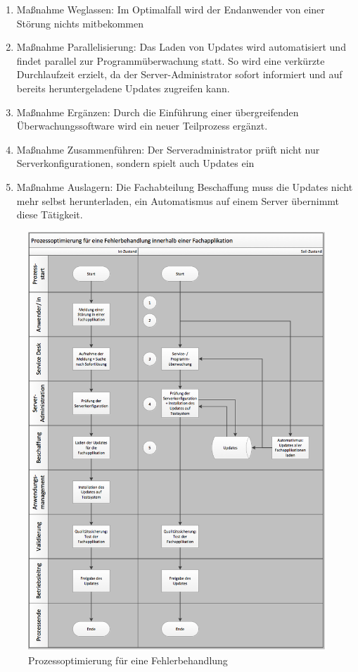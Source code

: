 \begin{enumerate}
	\item Maßnahme Weglassen: Im Optimalfall wird der Endanwender von einer Störung nichts mitbekommen
	\item Maßnahme Parallelisierung: Das Laden von Updates wird automatisiert und findet parallel zur Programmüberwachung statt. So wird eine verkürzte Durchlaufzeit erzielt, da der Server-Administrator sofort informiert und auf bereits heruntergeladene Updates zugreifen kann.
	\item Maßnahme Ergänzen: Durch die Einführung einer übergreifenden Überwachungssoftware wird ein neuer Teilprozess ergänzt.
	\item Maßnahme Zusammenführen: Der Serveradministrator prüft nicht nur Serverkonfigurationen, sondern spielt auch Updates ein
	\item Maßnahme Auslagern: Die Fachabteilung Beschaffung muss die Updates nicht mehr selbst herunterladen, ein Automatismus auf einem Server übernimmt diese Tätigkeit.
\end{enumerate}


\begin{figure}[h]
	\centering
	\includegraphics[width=\textwidth]{kapitel/gruppe1_2/bilder/prozessoptimierung} 
	\caption{Prozessoptimierung für eine Fehlerbehandlung}
	\label{fig_prozessoptimierung}
\end{figure}
\clearpage

